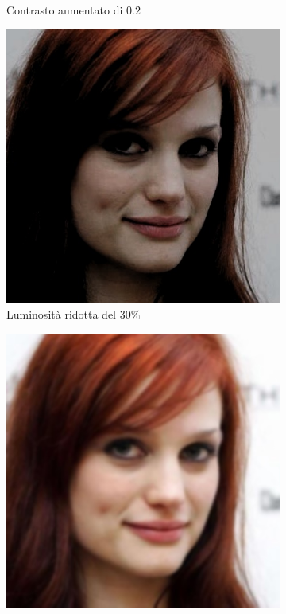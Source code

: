 \begin{figure}[ht]
\begin{subfigure}[t]{0.18\textwidth}
\caption{Contrasto aumentato di $0.2$}
\label{sfig:corruption_contrast}
\end{subfigure}\hfill
\begin{subfigure}[t]{0.18\textwidth}
\includegraphics[width=\textwidth]{./Images/brightness_severity_-0.3.jpg}
\caption{Luminosità ridotta del $30\%$}
\label{sfig:corruption_brightness}
\end{subfigure}\hfill
\begin{subfigure}[t]{0.18\textwidth}
\includegraphics[width=\textwidth]{./Images/gaussian_blur_severity_2.0.jpg}

\end{subfigure}
\end{figure}
